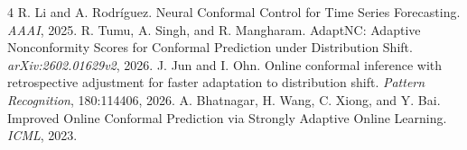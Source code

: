 \documentclass{article}
\begin{document}
\begin{thebibliography}{4}
\small
{}
R. Li and A. Rodr\'{i}guez. Neural Conformal Control for Time Series Forecasting. \emph{AAAI}, 2025.
R. Tumu, A. Singh, and R. Mangharam. AdaptNC: Adaptive Nonconformity Scores for Conformal Prediction under Distribution Shift. \emph{arXiv:2602.01629v2}, 2026.
J. Jun and I. Ohn. Online conformal inference with retrospective adjustment for faster adaptation to distribution shift. \emph{Pattern Recognition}, 180:114406, 2026.
A. Bhatnagar, H. Wang, C. Xiong, and Y. Bai. Improved Online Conformal Prediction via Strongly Adaptive Online Learning. \emph{ICML}, 2023.
\end{thebibliography}
\end{document}
